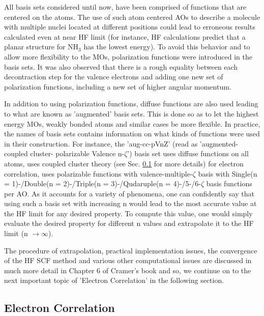             All basis sets considered until now, have been comprised of functions that are centered on the atoms. The use of such atom centered AOs to describe a molecule with multiple nuclei located at different positions could lead to erroneous results calculated even at near HF limit (for instance, HF calculations predict that a planar structure for NH$_3$ has the lowest energy). To avoid this behavior and to allow more flexibility to the MOs, polarization functions were introduced in the basis sets. It was also observed that there is a rough equality between each decontraction step for the valence electrons and adding one new set of polarization functions, including a new set of higher angular momentum.

            In addition to using polarization functions, diffuse functions are also used leading to what are known as 'augmented' basis sets. This is done so as to let the highest energy MOs, weakly bonded atoms and similar cases be more flexible. In practice, the names of basis sets contains information on what kinds of functions were used in their construction. For instance, the 'aug-cc-pVnZ' (read as 'augmented-coupled cluster- polarizable Valence n-$\zeta$') basis set uses diffuse functions on all atoms, uses coupled cluster theory (see Sec. \ref{sec:electron correlation} for more details) for electron correlation, uses polarizable functions with valence-multiple-$\zeta$ basis with Single(n = 1)-/Double(n = 2)-/Triple(n = 3)-/Qudaruple(n = 4)-/5-/6-$\zeta$ basis functions per AO. As it accounts for a variety of phenomena, one can confidently say that using such a basis set with increasing n would lead to the most accurate value at the HF limit for any desired property. To compute this value, one would simply evaluate the desired property for different n values and extrapolate it to the HF limit (n $\to \infty$).

            The procedure of extrapolation, practical implementation issues, the convergence of the HF SCF method and various other computational issues are discussed in much more detail in Chapter 6 of Cramer's book \cite{Cramer} and so, we continue on to the next important topic of 'Electron Correlation' in the following section.

        \subsection{Electron Correlation}\label{sec:electron correlation}


